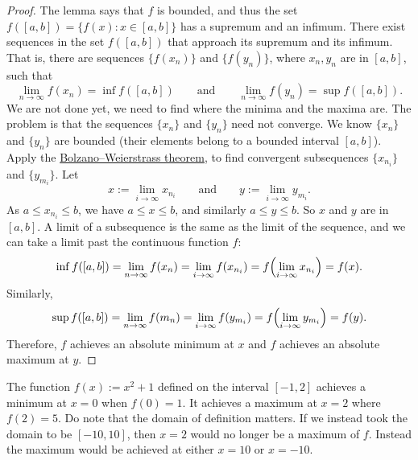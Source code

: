 \begin{proof}
The lemma says that $f$ is bounded, and thus
the set $f([a,b]) = \{ f(x) : x \in [a,b] \}$ has a supremum and an infimum.
There exist sequences
in the set $f([a,b])$ that approach its supremum and its infimum.
That is, there are sequences
$\{ f(x_n) \}$ and $\{ f(y_n) \}$, where $x_n, y_n$ are in $[a,b]$,
such that
\begin{equation*}
\lim_{n\to\infty} f(x_n) = \inf f([a,b]) \qquad \text{and} \qquad
\lim_{n\to\infty} f(y_n) = \sup f([a,b]).
\end{equation*}
We are not done yet, we need to find where the minima and the maxima are.
The problem is that the sequences $\{ x_n \}$ and $\{ y_n \}$ need not
converge.
We know $\{ x_n \}$ and $\{ y_n \}$ are bounded (their elements
belong to 
a bounded interval $[a,b]$).
Apply the 
\hyperref[thm:bwseq]{Bolzano--Weierstrass theorem},
to find
convergent subsequences
$\{ x_{n_i} \}$ and 
$\{ y_{m_i} \}$.  Let
\begin{equation*}
x := \lim_{i\to\infty} x_{n_i}
\qquad \text{and} \qquad
y := \lim_{i\to\infty} y_{m_i}.
\end{equation*}
As $a \leq x_{n_i} \leq b$, we have $a \leq x \leq b$,
and similarly $a \leq y \leq b$.  So $x$ and $y$ are in $[a,b]$.
A limit of a subsequence is the same as the limit of the
sequence, and we can take a limit past the continuous function $f$:
\begin{equation*}
\inf f([a,b]) = \lim_{n\to\infty} f(x_n)
= \lim_{i\to\infty} f(x_{n_i}) = 
f \Bigl( \lim_{i\to\infty} x_{n_i} \Bigr) = f(x) .
\end{equation*}
Similarly,
\begin{equation*}
\sup f([a,b]) = \lim_{n\to\infty} f(m_n)
= \lim_{i\to\infty} f(y_{m_i}) = 
f \Bigl( \lim_{i\to\infty} y_{m_i} \Bigr) = f(y) .
\end{equation*}
Therefore, $f$ achieves an absolute minimum at $x$ and
$f$ achieves an absolute maximum at $y$.
\end{proof}

\begin{example}
The function $f(x) := x^2+1$ defined on the interval $[-1,2]$ achieves a minimum
at $x=0$ when $f(0) = 1$.  It achieves a maximum at $x=2$ where $f(2) = 5$.
Do note that the domain of definition matters.  If we instead took the domain
to be $[-10,10]$, then $x=2$ would no longer be a maximum of $f$.  Instead
the maximum would be achieved at either $x=10$ or $x=-10$.
\end{example}

